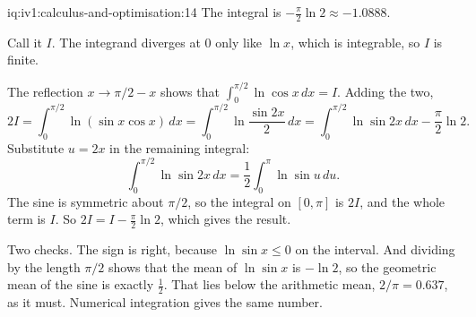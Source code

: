 \begin{solution}{iq:iv1:calculus-and-optimisation:14}
The integral is $-\frac{\pi}{2}\ln 2 \approx -1.0888$.

Call it $I$. The integrand diverges at 0 only like $\ln x$, which is integrable, so $I$ is finite.

The reflection $x \to \pi/2 - x$ shows that $\int_0^{\pi/2}\ln\cos x\,dx = I$. Adding the two,
\[
2I = \int_0^{\pi/2}\ln(\sin x\cos x)\,dx = \int_0^{\pi/2}\ln\frac{\sin 2x}{2}\,dx = \int_0^{\pi/2}\ln\sin 2x\,dx - \frac{\pi}{2}\ln 2.
\]
Substitute $u = 2x$ in the remaining integral:
\[
\int_0^{\pi/2}\ln\sin 2x\,dx = \frac12\int_0^{\pi}\ln\sin u\,du.
\]
The sine is symmetric about $\pi/2$, so the integral on $[0, \pi]$ is $2I$, and the whole term is $I$. So $2I = I - \frac{\pi}{2}\ln 2$, which gives the result.

Two checks. The sign is right, because $\ln\sin x \le 0$ on the interval. And dividing by the length $\pi/2$ shows that the mean of $\ln\sin x$ is $-\ln 2$, so the geometric mean of the sine is exactly $\frac12$. That lies below the arithmetic mean, $2/\pi = 0.637$, as it must. Numerical integration gives the same number.



\end{solution}

